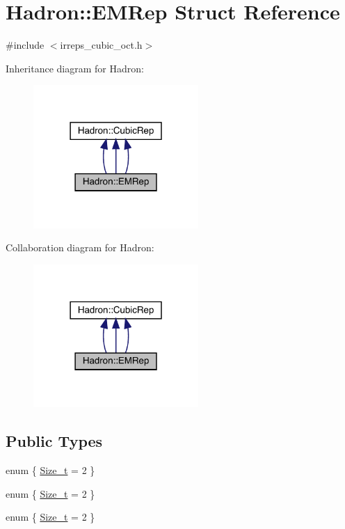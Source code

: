 \hypertarget{structHadron_1_1EMRep}{}\section{Hadron\+:\+:E\+M\+Rep Struct Reference}
\label{structHadron_1_1EMRep}


{\ttfamily \#include $<$irreps\+\_\+cubic\+\_\+oct.\+h$>$}



Inheritance diagram for Hadron\+:
\nopagebreak
\begin{figure}[H]
\begin{center}
\leavevmode
\includegraphics[width=178pt]{d0/d94/structHadron_1_1EMRep__inherit__graph}
\end{center}
\end{figure}


Collaboration diagram for Hadron\+:
\nopagebreak
\begin{figure}[H]
\begin{center}
\leavevmode
\includegraphics[width=178pt]{de/d21/structHadron_1_1EMRep__coll__graph}
\end{center}
\end{figure}
\subsection*{Public Types}
\begin{DoxyCompactItemize}
\item 
enum \{ \mbox{\hyperlink{structHadron_1_1EMRep_a8286e91c3ce5a7bb1323ce33bc53f8fba95cfc91bb6a89057579f519ca41a8015}{Size\+\_\+t}} = 2
 \}
\item 
enum \{ \mbox{\hyperlink{structHadron_1_1EMRep_a8286e91c3ce5a7bb1323ce33bc53f8fba95cfc91bb6a89057579f519ca41a8015}{Size\+\_\+t}} = 2
 \}
\item 
enum \{ \mbox{\hyperlink{structHadron_1_1EMRep_a8286e91c3ce5a7bb1323ce33bc53f8fba95cfc91bb6a89057579f519ca41a8015}{Size\+\_\+t}} = 2
 \}
\end{DoxyCompactItemize}
